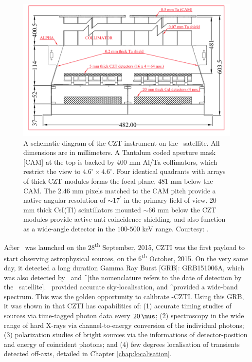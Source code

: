 \begin{figure}
\begin{center}
\includegraphics[scale=0.33]{GRB151006A--CZT}
\caption[Schematic diagram of \AS -CZTI]{A schematic diagram of the CZT instrument on the \AS\ satellite. All dimensions are in millimeters. A Tantalum coded aperture mask [CAM] at the top is backed by $400$ mm Al/Ta collimators, which restrict the view to $4.6^{\circ} \times 4.6^{\circ}$. Four identical quadrants with arrays of thick CZT modules forms the focal plane, $481$ mm below the CAM. The $2.46$ mm pixels matched to the CAM pitch provide a native angular resolution of $\sim 17^{'}$ in the primary field of view. $20$ mm thick CsI(Tl) scintillators mounted $\sim 66$ mm below the CZT modules provide active anti-coincidence shielding, and also function as a wide-angle detector in the $100$-$500$ keV range. Courtesy: \cite{Rao_et_al.-2016-ApJ}.}
\label{fig:CZTI}
\end{center}
\end{figure}

After \AS\ was launched on the 28\textsuperscript{th} September, 2015, CZTI was the first payload to start observing astrophysical sources, on the 6\textsuperscript{th} October, 2015. On the very same day, it detected a long duration Gamma Ray Burst [GRB]: GRB151006A, which was also detected by \s\ and \f\ [the nomenclature refers to the date of detection by the \s\ satellite]. \s\ provided accurate sky-localisation, and \f\ provided a wide-band spectrum. This was the golden opportunity to calibrate \AS -CZTI. Using this GRB, it was shown in \cite{Rao_et_al.-2016-ApJ} that CZTI has capabilities of: (1) accurate timing studies of sources via time-tagged photon data every $20 \, \mus$; (2) spectroscopy in the wide range of hard X-rays via channel-to-energy conversion of the individual photons; (3) polarization studies of bright sources via the informations of detector-position and energy of coincident photons; and (4) few degrees localisation of transients detected off-axis, detailed in Chapter \ref{chap:localisation}.

